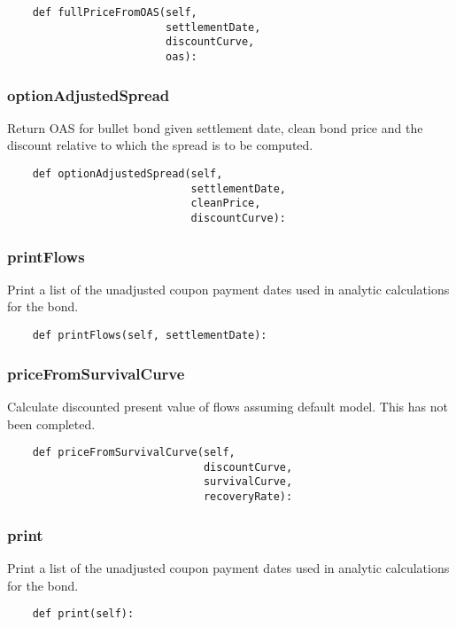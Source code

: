\documentclass[twoside,11pt]{book}
\begin{document}
\begin{lstlisting}
    def fullPriceFromOAS(self,
                         settlementDate,
                         discountCurve,
                         oas):
\end{lstlisting}

\subsubsection*{{\bf optionAdjustedSpread}}
Return OAS for bullet bond given settlement date, clean bond price and the discount relative to which the spread is to be computed.  

\begin{lstlisting}
    def optionAdjustedSpread(self,
                             settlementDate,
                             cleanPrice,
                             discountCurve):
\end{lstlisting}

\subsubsection*{{\bf printFlows}}
Print a list of the unadjusted coupon payment dates used in analytic calculations for the bond.  

\begin{lstlisting}
    def printFlows(self, settlementDate):
\end{lstlisting}

\subsubsection*{{\bf priceFromSurvivalCurve}}
Calculate discounted present value of flows assuming default model. This has not been completed.  

\begin{lstlisting}
    def priceFromSurvivalCurve(self,
                               discountCurve,
                               survivalCurve,
                               recoveryRate):
\end{lstlisting}

\subsubsection*{{\bf print}}
Print a list of the unadjusted coupon payment dates used in analytic calculations for the bond.  

\begin{lstlisting}
    def print(self):
\end{lstlisting}
\end{document}
